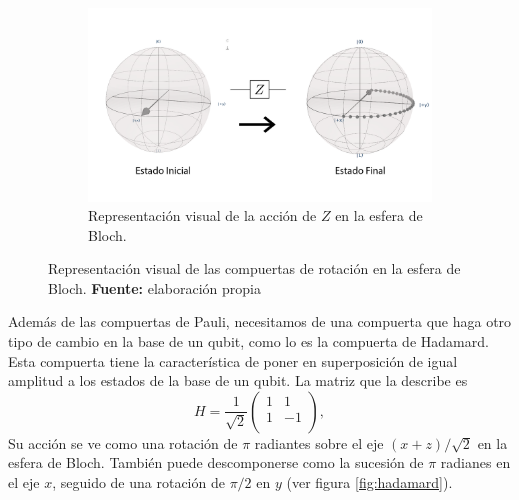 \documentclass[letterpaper,12pt]{thesisECFM}
\theoremstyle{plain}
\theoremstyle{definition}
\theoremstyle{definition}
\theoremstyle{remark}
\newcommand{\1}{\mathbb{1}}
\begin{document}
\begin{figure}[h!]
    \vspace{1em} %
    \begin{subfigure}{0.45\textwidth}
        \centering
        \includegraphics[width=\linewidth]{imagenes/Pauliz.png}
        \caption{Representación visual de la acción de $Z$ en la esfera de Bloch.}
        \label{fig:Pauliz}
    \end{subfigure}
    
    \caption{Representación visual de las compuertas de rotación en la esfera de Bloch. \textbf{Fuente:} elaboración propia}
    \label{fig:rep_pauli}
\end{figure} %

Además de las compuertas de Pauli, necesitamos de una compuerta que haga otro
tipo de cambio en la base de un qubit, como lo es la compuerta de
Hadamard. Esta compuerta tiene la característica de poner en
superposición de igual amplitud a los estados de la base de un qubit.
La matriz que la describe es
\begin{equation}
    H= \frac{1}{\sqrt{2}}
    \begin{pmatrix}
     1& 1 \\
     1& -1 \\
    \end{pmatrix},
\end{equation} 
Su acción se ve como una rotación de $\pi$ radiantes sobre el eje
$(x+z)/\sqrt{2}$ en la esfera de Bloch.  También puede descomponerse como la
sucesión de $\pi$ radianes en el eje $x$, seguido de una rotación de $\pi/2$ en
$y$ (ver figura \ref{fig:hadamard}).
\end{document}
